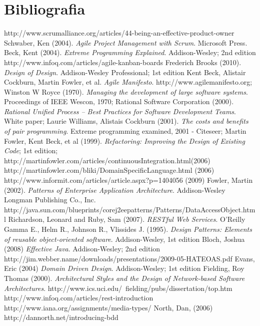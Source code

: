 \section{Bibliografia}

\begin{thebibliography}{30} 

 http://www.scrumalliance.org/articles/44-being-an-effective-product-owner
 Schwaber, Ken (2004). \textit{Agile Project Management with Scrum}. Microsoft Press.
 Beck, Kent (2004). \textit{Extreme Programming Explained}. Addison-Wesley; 2nd edition
 http://www.infoq.com/articles/agile-kanban-boards
 Frederich Brooks (2010). \textit{Design of Design}. Addison-Wesley Professional; 1st edition
 Kent Beck, Alistair Cockburn, Martin Fowler, et al. \textit{Agile Manifesto}. http://www.agilemanifesto.org;
 Winston W Royce (1970). \textit{Managing the development of large software systems}.
Proceedings of IEEE Wescon, 1970;
 Rational Software Corporation (2000). \textit{Rational Unified Process -- Best Practices for Software Development Teams}. White paper;
 Laurie Williams, Alistais Cockburn (2001). \textit{The costs and benefits of pair programming}. Extreme programming examined, 2001 - Citeseer;
 Martin Fowler, Kent Beck, et al (1999). \textit{Refactoring: Improving the Design of Existing Code}; 1st edition;
 http://martinfowler.com/articles/continuousIntegration.html(2006)
 http://martinfowler.com/bliki/DomainSpecificLanguage.html (2006)
 http://www.informit.com/articles/article.aspx?p=1404056 (2009)
 Fowler, Martin (2002). \textit{Patterns of Enterprise Application Architecture}.  Addison-Wesley Longman Publishing Co., Inc.
 http://java.sun.com/blueprints/corej2eepatterns/Patterns/DataAccessObject.html
 Richardson, Leonard and Ruby, Sam (2007). \textit{RESTful Web Services}. O'Reilly
 Gamma E., Helm R., Johnson R., Vlissides J. (1995). \textit{Design Patterns: Elements of reusable object-oriented software}. Addison-Wesley, 1st edition
 Bloch, Joshua (2008) \textit{Effective Java}. Addison-Wesley; 2nd edition
 http://jim.webber.name/downloads/presentations/2009-05-HATEOAS.pdf
 Evans, Eric (2004) \textit{Domain Driven Design}. Addison-Wesley; 1st edition 
 Fielding, Roy Thomas (2000). \textit{Architectural Styles and the Design of Network-based Software Architectures}. http://www.ics.uci.edu/~fielding/pubs/dissertation/top.htm
 http://www.infoq.com/articles/rest-introduction
 http://www.iana.org/assignments/media-types/
 North, Dan, (2006) http://dannorth.net/introducing-bdd

\end{thebibliography}
